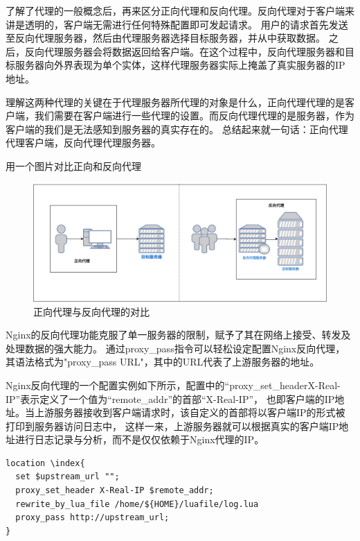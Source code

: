 了解了代理的一般概念后，再来区分正向代理和反向代理。反向代理对于客户端来讲是透明的，客户端无需进行任何特殊配置即可发起请求。
用户的请求首先发送至反向代理服务器，然后由代理服务器选择目标服务器，并从中获取数据。
之后，反向代理服务器会将数据返回给客户端。在这个过程中，反向代理服务器和目标服务器向外界表现为单个实体，这样代理服务器实际上掩盖了真实服务器的IP地址。

理解这两种代理的关键在于代理服务器所代理的对象是什么，正向代理代理的是客户端，我们需要在客户端进行一些代理的设置。而反向代理代理的是服务器，作为客户端的我们是无法感知到服务器的真实存在的。
总结起来就一句话：正向代理代理客户端，反向代理代理服务器\cite{崔娟2023基于Nginx反向代理解决公网上服务跨域问题的研究}。

用一个图片对比正向和反向代理

\begin{figure}[htb]
	\centering
	\includegraphics[width=\textwidth]{figures/Forward-Proxy-Reverse-Proxy.png}
	\caption{正向代理与反向代理的对比}
\end{figure}

Nginx的反向代理功能克服了单一服务器的限制，赋予了其在网络上接受、转发及处理数据的强大能力\cite{马原龙2016nginx}。
通过proxy\_pass指令可以轻松设定配置Nginx反向代理，其语法格式为"proxy\_pass URL"，其中的URL代表了上游服务器的地址。

Nginx反向代理的一个配置实例如下所示，配置中的“proxy\_set\_headerX-Real-IP”表示定义了一个值为“remote\_addr”的首部“X-Real-IP”，
也即客户端的IP地址。当上游服务器接收到客户端请求时，该自定义的首部将以客户端IP的形式被打印到服务器访问日志中，
这样一来，上游服务器就可以根据真实的客户端IP地址进行日志记录与分析，而不是仅仅依赖于Nginx代理的IP\cite{吴陈2020基于Nginx的服务器集群负载均衡策略的研究与改进}。

\noindent \begin{lstlisting}[caption={Nginx 反向代理默认配置}]
location \index{
  set $upstream_url "";
  proxy_set_header X-Real-IP $remote_addr;
  rewrite_by_lua_file /home/${HOME}/luafile/log.lua
  proxy_pass http://upstream_url;
}
\end{lstlisting}

